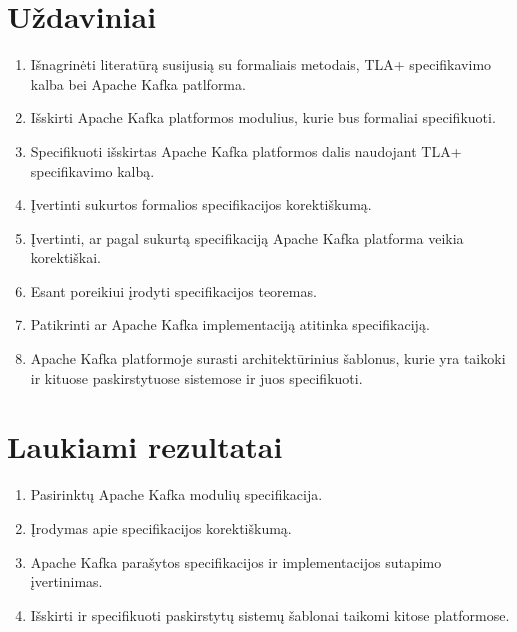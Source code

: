 \documentclass{VUMIFPSmagistrinis}
\begin{document}
	\section{Uždaviniai}
		\begin{enumerate}
			\item{Išnagrinėti literatūrą susijusią su formaliais metodais, TLA+ specifikavimo kalba bei Apache Kafka patlforma.}
			\item{Išskirti Apache Kafka platformos modulius, kurie bus formaliai specifikuoti.}
			\item{Specifikuoti išskirtas Apache Kafka platformos dalis naudojant TLA+ specifikavimo kalbą.}
			\item{Įvertinti sukurtos formalios specifikacijos korektiškumą.}
			\item{Įvertinti, ar pagal sukurtą specifikaciją Apache Kafka platforma veikia korektiškai.}
			\item{Esant poreikiui įrodyti specifikacijos teoremas.}
			\item{Patikrinti ar Apache Kafka implementaciją atitinka specifikaciją.}
			\item{Apache Kafka platformoje surasti architektūrinius šablonus, kurie yra taikoki ir kituose paskirstytuose sistemose ir juos specifikuoti.}
		\end{enumerate}
	
	\section{Laukiami rezultatai}
		\begin{enumerate}
			\item{Pasirinktų Apache Kafka modulių specifikacija.}
			\item{Įrodymas apie specifikacijos korektiškumą.}
			\item{Apache Kafka parašytos specifikacijos ir implementacijos sutapimo įvertinimas.}
			\item{Išskirti ir specifikuoti paskirstytų sistemų šablonai taikomi kitose platformose.}
		\end{enumerate}
	
	\printbibliography[heading=bibintoc] 


\appendix
\end{document}
